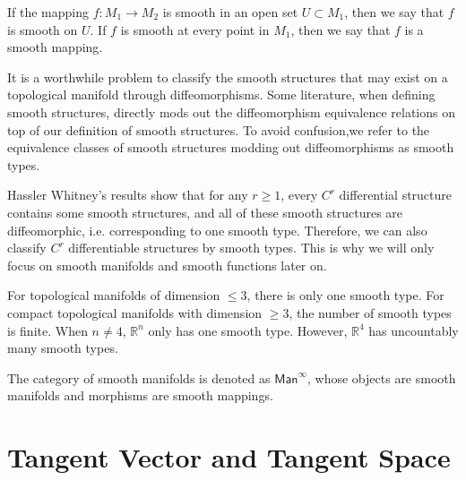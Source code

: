 \documentclass{report}
\begin{document}
If the mapping $f:M_1\to M_2$ is smooth in an open set $U\subset M_1$, then we say that $f$ is smooth on $U$. If $f$ is smooth at every point in $M_1$, then we say that $f$ is a smooth mapping.


It is a worthwhile problem to classify the smooth structures that may exist on a topological manifold through diffeomorphisms. Some literature, when defining smooth structures, directly mods out the diffeomorphism equivalence relations on top of our definition of smooth structures. To avoid confusion,we refer to the equivalence classes of smooth structures modding out diffeomorphisms as smooth types.


Hassler Whitney's results show that for any $r\ge 1$, every $C^r$ differential structure contains some smooth structures, and all of these smooth structures are diffeomorphic, i.e. corresponding to one smooth type. Therefore, we can also classify $C^r$ differentiable structures by smooth types. This is why we will only focus on smooth manifolds and smooth functions later on. 

For topological manifolds of dimension $\le 3$, there is only one smooth type. For compact topological manifolds with dimension $\ge 3$, the number of smooth types is finite. When $n\ne 4$, $\mathbb{R}^n$ only has one smooth type. However, $\mathbb{R}^4$ has uncountably many smooth types.

The category of smooth manifolds is denoted as $\mathsf{Man}^\infty$, whose objects are smooth manifolds and morphisms are smooth mappings.

\section{Tangent Vector and Tangent Space}
\end{document}
